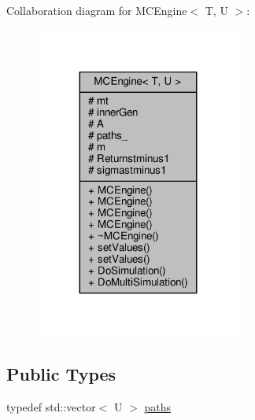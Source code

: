 Collaboration diagram for M\+C\+Engine$<$ T, U $>$\+:
\nopagebreak
\begin{figure}[H]
\begin{center}
\leavevmode
\includegraphics[width=191pt]{classMCEngine__coll__graph}
\end{center}
\end{figure}
\subsection*{Public Types}
\begin{DoxyCompactItemize}
\item 
typedef std\+::vector$<$ U $>$ \hyperlink{classMCEngine_a977f1048508a1467c496c2c47231d1d3}{paths}
\end{DoxyCompactItemize}
